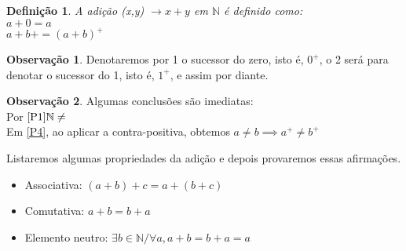 \documentclass[
	12pt,				%
	oneside,			%
	a4paper,			%
	english,			%
	french,				%
	spanish,			%
	brazil,				%
	]{abntex2}
\newcommand{\N}{\ensuremath {\mathbb{N}} }
\theoremstyle{plain}
\newtheorem{defi}{Definição}[chapter]
\theoremstyle{definition}
\newtheorem{obs}{Observação}[chapter]
\begin{document}
\begin{defi}{A adição (x,y) $\rightarrow x + y$ em \N é definido como: \\
	$a + 0 = a$ \\
	$a + b+ = (a + b)^+$
}\label{adicao}

\end{defi}

\begin{obs}
	Denotaremos por 1 o sucessor do zero, isto é, $0^+$, o 2 será para denotar o sucessor do 1, isto é, $1^+$, e assim por diante.
\end{obs}
\begin{obs}
	Algumas conclusões são imediatas:\\
	Por $\ref{P1} \N \neq  $ \\
	Em \ref{P4}, ao aplicar a contra-positiva, obtemos $a \neq b \implies a^+ \neq b^+$
\end{obs}

Listaremos algumas propriedades da adição e depois provaremos essas afirmações.
\begin{itemize}
	\item Associativa: $(a + b) + c = a + (b + c)$
	\item Comutativa: $a + b =  b + a$
	\item Elemento neutro: $\exists b \in \N / \forall a, a + b = b + a = a$
\end{itemize}


\end{document}
